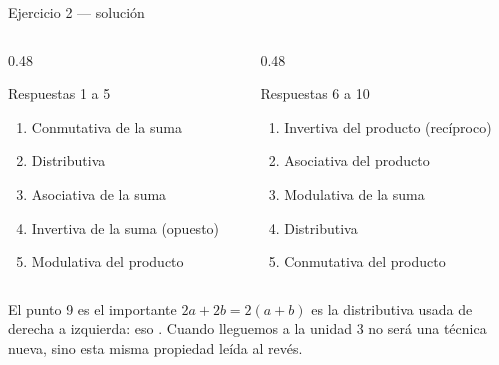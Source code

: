 \documentclass[aspectratio=169,10pt]{beamer}
\begin{document}
\begin{frame}{Ejercicio 2 — solución}
  \scriptsize
  \begin{columns}[T,onlytextwidth]
    \begin{column}{0.48\textwidth}
      \begin{block}{Respuestas 1 a 5}
        \scriptsize
        \begin{enumerate}\setlength{\itemsep}{-0.02cm}
          \item Conmutativa de la suma
          \item Distributiva
          \item Asociativa de la suma
          \item Invertiva de la suma (opuesto)
          \item Modulativa del producto
        \end{enumerate}
      \end{block}
    \end{column}
    \begin{column}{0.48\textwidth}
      \begin{block}{Respuestas 6 a 10}
        \scriptsize
        \begin{enumerate}\setlength{\itemsep}{-0.02cm}
          \setcounter{enumi}{5}
          \item Invertiva del producto (recíproco)
          \item Asociativa del producto
          \item Modulativa de la suma
          \item Distributiva 
          \item Conmutativa del producto
        \end{enumerate}
      \end{block}
    \end{column}
  \end{columns}

  \vspace{0.1cm}
  \begin{alertblock}{El punto 9 es el importante}
    \scriptsize
    $2a + 2b = 2(a+b)$ es la distributiva usada de derecha a izquierda: eso
    . Cuando lleguemos a la unidad 3 no será una
    técnica nueva, sino esta misma propiedad leída al revés.
  \end{alertblock}
\end{frame}
\end{document}
